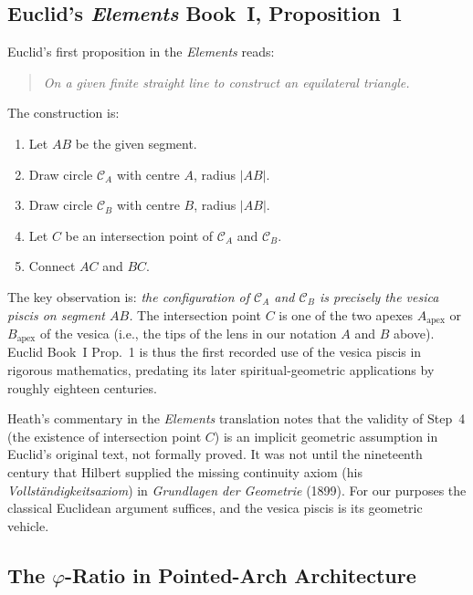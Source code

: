 \subsection{Euclid's \emph{Elements} Book~I, Proposition~1}
\label{subsec:ch11-euclid-prop1}

Euclid's first proposition in the \emph{Elements}
\cite{euclid_elements} reads:
\begin{quote}
\emph{On a given finite straight line to construct an equilateral
triangle.}
\end{quote}

The construction is:
\begin{enumerate}
\item Let \(AB\) be the given segment.
\item Draw circle \(\mathcal{C}_A\) with centre \(A\), radius \(|AB|\).
\item Draw circle \(\mathcal{C}_B\) with centre \(B\), radius \(|AB|\).
\item Let \(C\) be an intersection point of \(\mathcal{C}_A\) and
      \(\mathcal{C}_B\).
\item Connect \(AC\) and \(BC\).
\end{enumerate}

The key observation is:
\emph{the configuration of \(\mathcal{C}_A\) and \(\mathcal{C}_B\) is
precisely the vesica piscis on segment \(AB\).}
The intersection point \(C\) is one of the two apexes \(A_{\text{apex}}\)
or \(B_{\text{apex}}\) of the vesica (i.e., the tips of the lens in our
notation \(A\) and \(B\) above).
Euclid Book~I Prop.~1 is thus the first recorded use of the vesica piscis
in rigorous mathematics, predating its later spiritual-geometric
applications by roughly eighteen centuries.

Heath's commentary in the \emph{Elements} translation \cite{euclid_elements}
notes that the validity of Step~4 (the existence of intersection point
\(C\)) is an implicit geometric assumption in Euclid's original text,
not formally proved.
It was not until the nineteenth century that Hilbert supplied the
missing continuity axiom (his \emph{Vollständigkeitsaxiom}) in
\emph{Grundlagen der Geometrie} (1899).
For our purposes the classical Euclidean argument suffices, and the
vesica piscis is its geometric vehicle.

\subsection{The \(\varphi\)-Ratio in Pointed-Arch Architecture}
\label{subsec:ch11-phi-arch}

